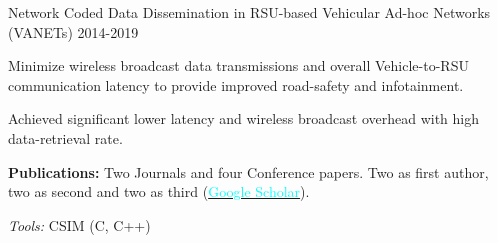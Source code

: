\begin{cventries}
\cventry
  {} %
  {Network Coded Data Dissemination in RSU-based Vehicular Ad-hoc Networks (VANETs)} %
  {2014-2019} %
  {} %
  {
    \vspace{-3mm}
    \begin{cvitems} %
      \item {Minimize wireless broadcast data transmissions and overall Vehicle-to-RSU communication latency to provide improved road-safety and infotainment.}
      \item {Achieved significant lower latency and wireless broadcast overhead with high data-retrieval rate.}
      \item {\textbf{Publications:} Two Journals and four Conference papers. Two as first author, two as second and two as third (\href{https://scholar.google.com/citations?user=hYY1wDEAAAAJ&hl=en}{\textcolor{cyan}{Google Scholar}}).}
      \item {\textit{Tools:} CSIM (C, C++)}
    \end{cvitems}
  }
  {}


\end{cventries}
